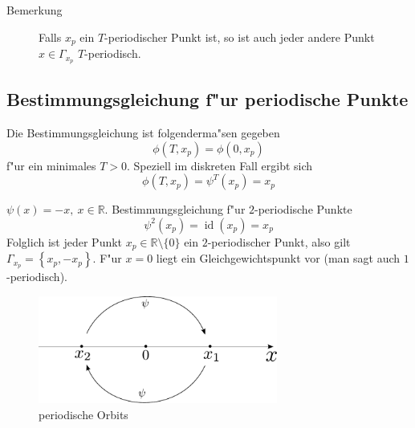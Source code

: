 \documentclass[a4paper, 13pt]{scrreprt}
\theoremstyle{definition} \newtheorem{definition}{Definition}[section]
\newenvironment{beispiel}[1][Beispiel]{\begin{trivlist}
\item[\hskip \labelsep {\bfseries #1}]}{\end{trivlist}}
\newcommand{\RR}{\mathbb{R}}
\begin{document}
\begin{description}
\item[Bemerkung]
Falls $x_p$ ein $T$-periodischer Punkt ist, so ist auch jeder andere Punkt $x\in \Gamma_{x_p}$ $T$-periodisch.
\end{description}
\subsection{Bestimmungsgleichung f"ur periodische Punkte}
Die Bestimmungsgleichung ist folgenderma"sen gegeben
$$\phi(T, x_p) = \phi(0, x_p)$$
f"ur ein minimales $T > 0$. Speziell im diskreten Fall ergibt sich
$$\phi(T, x_p) = \psi^T(x_p) = x_p$$

\begin{beispiel}
$\psi(x) = -x , \ x \in \RR$. 
Bestimmungsgleichung f"ur $2$-periodische Punkte
$$\psi^2(x_p) = \operatorname{id}(x_p) = x_p$$
Folglich ist jeder Punkt $x_p\in\RR\setminus\{0\}$ ein $2$-periodischer Punkt, also gilt ${\Gamma_{x_p} = \left \{ x_p, -x_p\right\}}$. F"ur $x = 0$ liegt ein Gleichgewichtspunkt vor (man sagt auch $1$-periodisch). 
\begin{figure}[htpb]
		\centering
		\includegraphics[width=0.7\textwidth]{img/periodische_orbits/beispiel_per_orbit.pdf}
		\caption{periodische Orbits}
\end{figure}
\end{beispiel}
\end{document}
